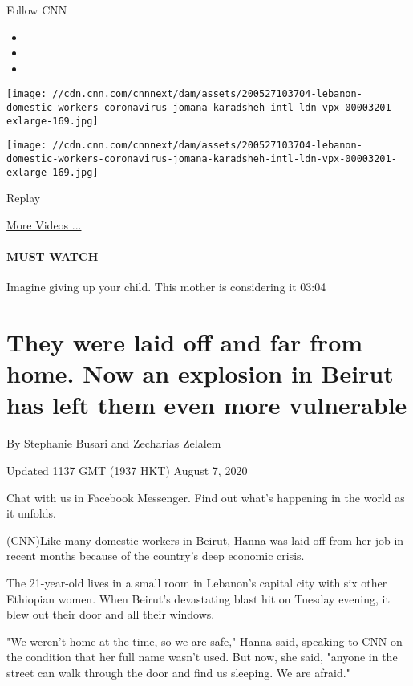 Follow CNN

\begin{itemize}
\item
\item
\item
\end{itemize}

\texttt{[image: //cdn.cnn.com/cnnnext/dam/assets/200527103704-lebanon-domestic-workers-coronavirus-jomana-karadsheh-intl-ldn-vpx-00003201-exlarge-169.jpg]}

\texttt{[image: //cdn.cnn.com/cnnnext/dam/assets/200527103704-lebanon-domestic-workers-coronavirus-jomana-karadsheh-intl-ldn-vpx-00003201-exlarge-169.jpg]}\href{javascript:void(0);}{}

Replay

\href{/videos}{More Videos ...}

\hypertarget{must-watch}{%
\paragraph{MUST WATCH}\label{must-watch}}

Imagine giving up your child. This mother is considering it 03:04

\hypertarget{they-were-laid-off-and-far-from-home-now-an-explosion-in-beirut-has-left-them-even-more-vulnerable}{%
\section{They were laid off and far from home. Now an explosion in
Beirut has left them even more
vulnerable}\label{they-were-laid-off-and-far-from-home-now-an-explosion-in-beirut-has-left-them-even-more-vulnerable}}

By \href{/profiles/stephanie-busari}{Stephanie Busari} and
\href{https://muckrack.com/zecharias-zelalem}{Zecharias Zelalem}

Updated 1137 GMT (1937 HKT) August 7, 2020

Chat with us in Facebook Messenger. Find out what's happening in the
world as it unfolds.

(CNN)Like many domestic workers in Beirut, Hanna was laid off from her
job in recent months because of the country's deep economic crisis.

The 21-year-old lives in a small room in Lebanon's capital city with six
other Ethiopian women. When Beirut's devastating blast hit on Tuesday
evening, it blew out their door and all their windows.

"We weren't home at the time, so we are safe," Hanna said, speaking to
CNN on the condition that her full name wasn't used. But now, she said,
"anyone in the street can walk through the door and find us sleeping. We
are afraid."


